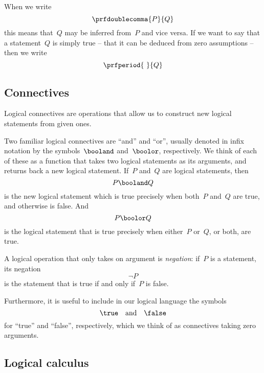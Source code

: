 When we write
\begin{equation*}
    \prfdoublecomma{
        P
    }{
        Q
    }
\end{equation*}
this means that~$Q$ may be inferred from~$P$ and vice versa.
If we want to say that a statement~$Q$ is simply true -- that it can be deduced from zero assumptions -- then we write
\begin{equation*}
    \prfperiod{
        \
    }{
        Q
    }
\end{equation*}

\subsection{Connectives}

Logical connectives are operations that allow us to construct new logical statements from given ones.

Two familiar logical connectives are ``and'' and ``or'', usually denoted in infix notation by the symbols~$\booland$ and~$\boolor$, respectively.
We think of each of these as a function that takes two logical statements as its arguments, and returns back a new logical statement.
If~$P$ and~$Q$ are logical statements, then~
\begin{equation*}
    P \booland Q
\end{equation*}
is the new logical statement which is true precisely when both~$P$ and~$Q$ are true, and otherwise is false.
And
\begin{equation*}
    P \boolor Q
\end{equation*}
is the logical statement that is true precisely when either~$P$ or~$Q$, or both, are true.

A logical operation that only takes on argument is \emph{negation}: if~$P$ is a statement, its negation
\begin{equation*}
    \lnot P
\end{equation*}
is the statement that is true if and only if~$P$ is false.

Furthermore, it is useful to include in our logical language the symbols~
\begin{equation}
    \true \quad \text{and}  \quad \false
\end{equation}
for ``true'' and ``false'', respectively, which we think of as connectives taking zero arguments.

\subsection{Logical calculus}

